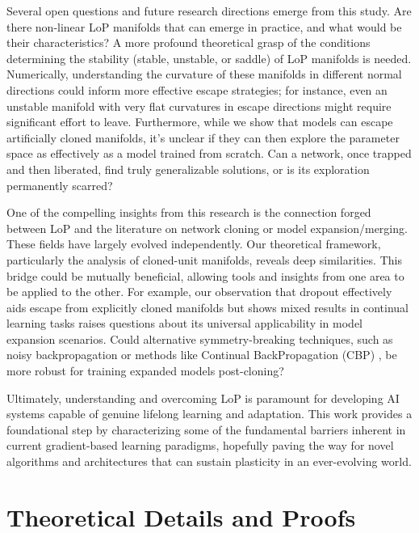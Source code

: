 \documentclass{article}
\begin{document}
Several open questions and future research directions emerge from this study.
Are there non-linear LoP manifolds that can emerge in practice, and what would be their characteristics? A more profound theoretical grasp of the conditions determining the stability (stable, unstable, or saddle) of LoP manifolds is needed. Numerically, understanding the curvature of these manifolds in different normal directions could inform more effective escape strategies; for instance, even an unstable manifold with very flat curvatures in escape directions might require significant effort to leave. Furthermore, while we show that models can escape artificially cloned manifolds, it's unclear if they can then explore the parameter space as effectively as a model trained from scratch. Can a network, once trapped and then liberated, find truly generalizable solutions, or is its exploration permanently scarred?

One of the compelling insights from this research is the connection forged between LoP and the literature on network cloning or model expansion/merging. These fields have largely evolved independently. Our theoretical framework, particularly the analysis of cloned-unit manifolds, reveals deep similarities. This bridge could be mutually beneficial, allowing tools and insights from one area to be applied to the other. For example, our observation that dropout effectively aids escape from explicitly cloned manifolds but shows mixed results in continual learning tasks raises questions about its universal applicability in model expansion scenarios. Could alternative symmetry-breaking techniques, such as noisy backpropagation or methods like Continual BackPropagation (CBP) \citep{dohare2024loss}, be more robust for training expanded models post-cloning?

Ultimately, understanding and overcoming LoP is paramount for developing AI systems capable of genuine lifelong learning and adaptation. This work provides a foundational step by characterizing some of the fundamental barriers inherent in current gradient-based learning paradigms, hopefully paving the way for novel algorithms and architectures that can sustain plasticity in an ever-evolving world.



\appendix

\section{Theoretical Details and Proofs}
\label{app:theory_details_proofs} %
\end{document}
